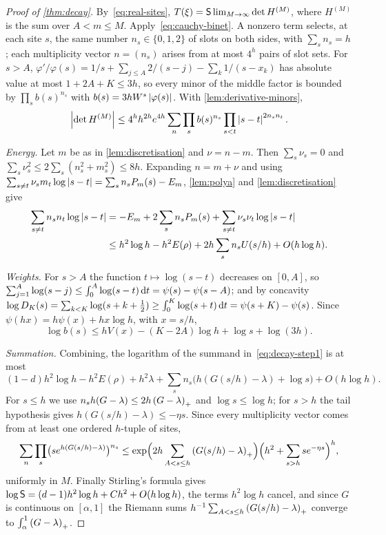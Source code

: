 \begin{proof}[Proof of \cref{thm:decay}]
By~\eqref{eq:real-sites}, $T(\xi)=\mathsf{S}\lim_{M\to\infty}\det H^{(M)}$, where $H^{(M)}$ is the sum
over $A<m\le M$. Apply~\eqref{eq:cauchy-binet}. A nonzero term selects, at each site $s$, the
same number $n_s\in\{0,1,2\}$ of slots on both sides, with $\sum_sn_s=h$; each multiplicity
vector $n=(n_s)$ arises from at most $4^h$ pairs of slot sets. For $s>A$,
$\varphi'/\varphi(s)=1/s+\sum_{j\le A}2/(s-j)-\sum_k1/(s-x_k)$ has absolute value at most
$1+2A+K\le3h$, so every minor of the middle factor is bounded by $\prod_sb(s)^{n_s}$ with
$b(s)=3hW^s\left\lvert \varphi(s)\right\rvert$. With \cref{lem:derivative-minors},
\begin{equation}\label{eq:decay-step1}
  \left\lvert \det H^{(M)}\right\rvert\le4^hh^{2h}e^{4h}\sum_n\prod_sb(s)^{n_s}\prod_{s<t}\left\lvert s-t\right\rvert^{2n_sn_t}.
\end{equation}

\emph{Energy.} Let $m$ be as in \cref{lem:discretisation} and $\nu=n-m$. Then $\sum_s\nu_s=0$ and
$\sum_s\nu_s^2\le2\sum_s(n_s^2+m_s^2)\le8h$. Expanding $n=m+\nu$ and using
$\sum_{s\ne t}\nu_sm_t\log\left\lvert s-t\right\rvert=\sum_sn_sP_m(s)-E_m$, \cref{lem:polya} and
\cref{lem:discretisation} give
\begin{align*}
  \sum_{s\ne t}n_sn_t\log\left\lvert s-t\right\rvert
  &=-E_m+2\sum_sn_sP_m(s)+\sum_{s\ne t}\nu_s\nu_t\log\left\lvert s-t\right\rvert\\
  &\le h^2\log h-h^2E(\rho)+2h\sum_sn_sU(s/h)+O(h\log h).
\end{align*}

\emph{Weights.} For $s>A$ the function $t\mapsto\log(s-t)$ decreases on $[0,A]$, so
$\sum_{j=1}^A\log(s-j)\le\int_0^A\log(s-t)\,\mathrm{d} t=\psi(s)-\psi(s-A)$; and by concavity
$\log D_K(s)=\sum_{k<K}\log(s+k+\frac12)\ge\int_0^K\log(s+t)\,\mathrm{d} t=\psi(s+K)-\psi(s)$. Since
$\psi(hx)=h\psi(x)+hx\log h$, with $x=s/h$,
\[
  \log b(s)\le hV(x)-(K-2A)\log h+\log s+\log(3h).
\]

\emph{Summation.} Combining, the logarithm of the summand in~\eqref{eq:decay-step1} is at most
\[
  (1-d)h^2\log h-h^2E(\rho)+h^2\lambda+\sum_sn_s\bigl(h(G(s/h)-\lambda)+\log s\bigr)+O(h\log h).
\]
For $s\le h$ we use $n_sh(G-\lambda)\le2h\left(G-\lambda\right)_{+}$ and $\log s\le\log h$; for $s>h$ the
tail hypothesis gives $h(G(s/h)-\lambda)\le-\eta s$. Since every multiplicity vector comes from at
least one ordered $h$-tuple of sites,
\[
  \sum_n\prod_s\bigl(se^{h(G(s/h)-\lambda)}\bigr)^{n_s}\le
  \exp\Bigl(2h\sum_{A<s\le h}\left(G(s/h)-\lambda\right)_{+}\Bigr)\Bigl(h^2+\sum_{s>h}se^{-\eta s}\Bigr)^h,
\]
uniformly in $M$. Finally Stirling's formula gives
$\log\mathsf{S}=(d-1)h^2\log h+Ch^2+O(h\log h)$, the terms $h^2\log h$ cancel, and since $G$ is
continuous on $[\alpha,1]$ the Riemann sums $h^{-1}\sum_{A<s\le h}\left(G(s/h)-\lambda\right)_{+}$ converge
to $\int_\alpha^1\left(G-\lambda\right)_{+}$.
\end{proof}

